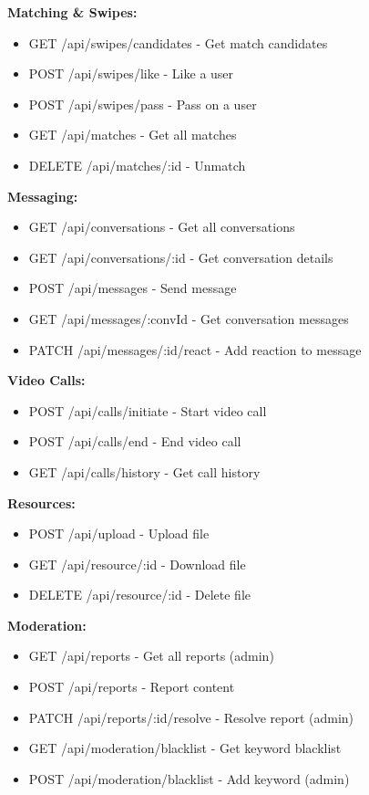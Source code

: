 \documentclass[a4paper,12pt]{report}
\begin{document}
\textbf{Matching \& Swipes:}
\begin{itemize}
    \item GET /api/swipes/candidates - Get match candidates
    \item POST /api/swipes/like - Like a user
    \item POST /api/swipes/pass - Pass on a user
    \item GET /api/matches - Get all matches
    \item DELETE /api/matches/:id - Unmatch
\end{itemize}

\textbf{Messaging:}
\begin{itemize}
    \item GET /api/conversations - Get all conversations
    \item GET /api/conversations/:id - Get conversation details
    \item POST /api/messages - Send message
    \item GET /api/messages/:convId - Get conversation messages
    \item PATCH /api/messages/:id/react - Add reaction to message
\end{itemize}

\textbf{Video Calls:}
\begin{itemize}
    \item POST /api/calls/initiate - Start video call
    \item POST /api/calls/end - End video call
    \item GET /api/calls/history - Get call history
\end{itemize}

\textbf{Resources:}
\begin{itemize}
    \item POST /api/upload - Upload file
    \item GET /api/resource/:id - Download file
    \item DELETE /api/resource/:id - Delete file
\end{itemize}

\textbf{Moderation:}
\begin{itemize}
    \item GET /api/reports - Get all reports (admin)
    \item POST /api/reports - Report content
    \item PATCH /api/reports/:id/resolve - Resolve report (admin)
    \item GET /api/moderation/blacklist - Get keyword blacklist
    \item POST /api/moderation/blacklist - Add keyword (admin)
\end{itemize}
\end{document}
